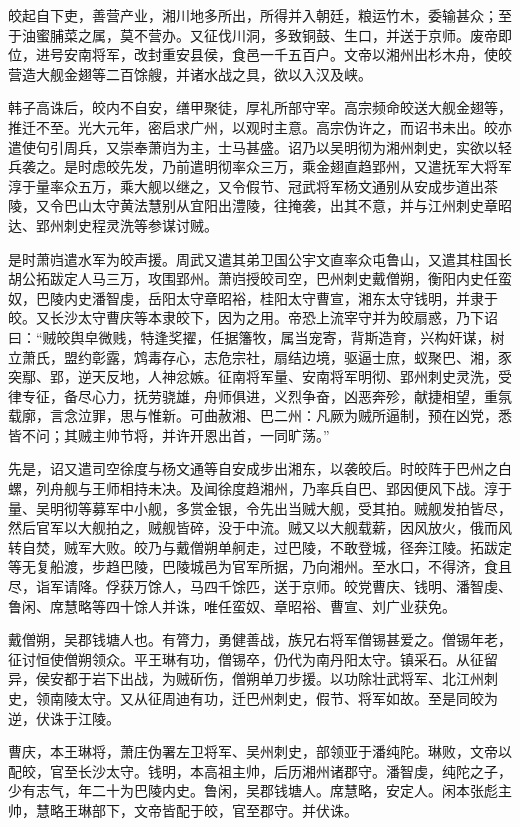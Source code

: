 \documentclass[]{article}
\begin{document}
皎起自下吏，善营产业，湘川地多所出，所得并入朝廷，粮运竹木，委输甚众；至于油蜜脯菜之属，莫不营办。又征伐川洞，多致铜鼓、生口，并送于京师。废帝即位，进号安南将军，改封重安县侯，食邑一千五百户。文帝以湘州出杉木舟，使皎营造大舰金翅等二百馀艘，并诸水战之具，欲以入汉及峡。

韩子高诛后，皎内不自安，缮甲聚徒，厚礼所部守宰。高宗频命皎送大舰金翅等，推迁不至。光大元年，密启求广州，以观时主意。高宗伪许之，而诏书未出。皎亦遣使句引周兵，又崇奉萧岿为主，士马甚盛。诏乃以吴明彻为湘州刺史，实欲以轻兵袭之。是时虑皎先发，乃前遣明彻率众三万，乘金翅直趋郢州，又遣抚军大将军淳于量率众五万，乘大舰以继之，又令假节、冠武将军杨文通别从安成步道出茶陵，又令巴山太守黄法慧别从宜阳出澧陵，往掩袭，出其不意，并与江州刺史章昭达、郢州刺史程灵洗等参谋讨贼。

是时萧岿遣水军为皎声援。周武又遣其弟卫国公宇文直率众屯鲁山，又遣其柱国长胡公拓跋定人马三万，攻围郢州。萧岿授皎司空，巴州刺史戴僧朔，衡阳内史任蛮奴，巴陵内史潘智虔，岳阳太守章昭裕，桂阳太守曹宣，湘东太守钱明，并隶于皎。又长沙太守曹庆等本隶皎下，因为之用。帝恐上流宰守并为皎扇惑，乃下诏曰：``贼皎舆皁微贱，特逢奖擢，任据籓牧，属当宠寄，背斯造育，兴构奸谋，树立萧氏，盟约彰露，鸩毒存心，志危宗社，扇结边境，驱逼士庶，蚁聚巴、湘，豕突鄢、郢，逆天反地，人神忿嫉。征南将军量、安南将军明彻、郢州刺史灵洗，受律专征，备尽心力，抚劳骁雄，舟师俱进，义烈争奋，凶恶奔殄，献捷相望，重氛载廓，言念泣罪，思与惟新。可曲赦湘、巴二州：凡厥为贼所逼制，预在凶党，悉皆不问；其贼主帅节将，并许开恩出首，一同旷荡。''

先是，诏又遣司空徐度与杨文通等自安成步出湘东，以袭皎后。时皎阵于巴州之白螺，列舟舰与王师相持未决。及闻徐度趋湘州，乃率兵自巴、郢因便风下战。淳于量、吴明彻等募军中小舰，多赏金银，令先出当贼大舰，受其拍。贼舰发拍皆尽，然后官军以大舰拍之，贼舰皆碎，没于中流。贼又以大舰载薪，因风放火，俄而风转自焚，贼军大败。皎乃与戴僧朔单舸走，过巴陵，不敢登城，径奔江陵。拓跋定等无复船渡，步趋巴陵，巴陵城邑为官军所据，乃向湘州。至水口，不得济，食且尽，诣军请降。俘获万馀人，马四千馀匹，送于京师。皎党曹庆、钱明、潘智虔、鲁闲、席慧略等四十馀人并诛，唯任蛮奴、章昭裕、曹宣、刘广业获免。

戴僧朔，吴郡钱塘人也。有膂力，勇健善战，族兄右将军僧锡甚爱之。僧锡年老，征讨恒使僧朔领众。平王琳有功，僧锡卒，仍代为南丹阳太守。镇采石。从征留异，侯安都于岩下出战，为贼斫伤，僧朔单刀步援。以功除壮武将军、北江州刺史，领南陵太守。又从征周迪有功，迁巴州刺史，假节、将军如故。至是同皎为逆，伏诛于江陵。

曹庆，本王琳将，萧庄伪署左卫将军、吴州刺史，部领亚于潘纯陀。琳败，文帝以配皎，官至长沙太守。钱明，本高祖主帅，后历湘州诸郡守。潘智虔，纯陀之子，少有志气，年二十为巴陵内史。鲁闲，吴郡钱塘人。席慧略，安定人。闲本张彪主帅，慧略王琳部下，文帝皆配于皎，官至郡守。并伏诛。
\end{document}

